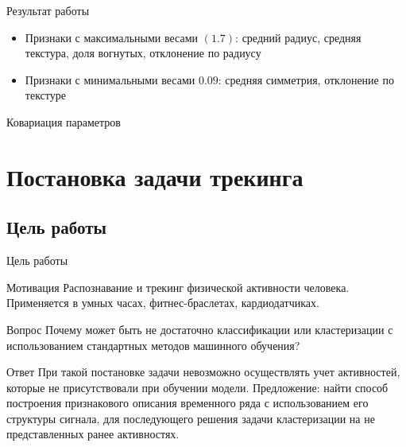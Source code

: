 \documentclass[unicode]{beamer}
\begin{document}
\begin{frame}{Результат работы}
\begin{itemize}
    \item Признаки с максимальными весами $(1.7)$: средний радиус, средняя текстура, доля вогнутых, отклонение по радиусу
    \item Признаки с минимальными весами $0.09$: средняя симметрия, отклонение по текстуре
\end{itemize}
\end{frame}

\begin{frame}{Ковариация параметров}
    \begin{figure}[!htbp]
        \begin{centering}
        \end{centering}
    \end{figure}
\end{frame}

\section{Постановка задачи трекинга}
\subsection{Цель работы}
\begin{frame}{Цель работы}

    \begin{block}{Мотивация}
    \footnotesize
        Распознавание и трекинг физической активности человека. Применяется в умных часах, фитнес-браслетах, кардиодатчиках.
    \end{block}

    \begin{block}{Вопрос}
        \footnotesize
            Почему может быть не достаточно классификации или кластеризации с использованием стандартных методов машинного обучения?
    \end{block}

    \begin{block}{Ответ}
        \footnotesize
            При такой постановке задачи невозможно осуществлять учет активностей, которые не присутствовали при обучении модели. 
            Предложение: найти способ построения признакового описания временного ряда с использованием его структуры сигнала, для последующего решения задачи кластеризации на не представленных ранее активностях.
        \end{block}
\end{frame}
\end{document}
